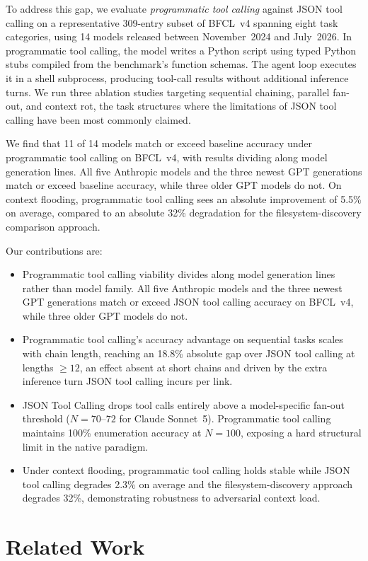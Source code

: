 \documentclass[11pt]{article}
\newcommand{\bfcl}{BFCL~v4}
\newcommand{\codemode}{programmatic tool calling}
\newcommand{\Codemode}{Programmatic tool calling}
\newcommand{\jsonmode}{JSON tool calling}
\newcommand{\Jsonmode}{JSON Tool Calling}
\newcommand{\nmodels}{14}
\begin{document}
To address this gap, we evaluate \textit{\codemode{}}
against \jsonmode{} on a representative 309-entry subset of \bfcl{}
spanning eight task categories, using \nmodels{} models released between November~2024
and July~2026.
In \codemode{}, the model writes a Python script using typed Python stubs compiled
from the benchmark's function schemas. The agent loop executes it in a shell
subprocess, producing tool-call results without additional inference turns.
We run three ablation studies targeting sequential chaining, parallel fan-out, and
context rot, the task structures where the limitations of \jsonmode{} have been
most commonly claimed.

We find that 11 of \nmodels{} models match or exceed baseline accuracy
under \codemode{} on \bfcl{}, with results dividing along model generation lines.
All five Anthropic models and the three newest GPT generations match or exceed
baseline accuracy, while three older GPT models do not.
On context flooding, \codemode{} sees an absolute improvement of 5.5\% on
average, compared to an absolute 32\% degradation for the
filesystem-discovery comparison approach.

Our contributions are:
\begin{itemize}
  \item \Codemode{} viability divides along model generation lines rather than
  model family. All five Anthropic models and the three newest GPT generations
  match or exceed \jsonmode{} accuracy on \bfcl{}, while three older GPT models
  do not.
  \item \Codemode{}'s accuracy advantage on sequential tasks scales with chain
  length, reaching an 18.8\% absolute gap over \jsonmode{} at lengths $\geq 12$,
  an effect absent at short chains and driven by the extra inference turn
  \jsonmode{} incurs per link.
  \item \Jsonmode{} drops tool calls entirely above a model-specific fan-out
  threshold ($N=70$--$72$ for Claude Sonnet~5). \Codemode{} maintains 100\%
  enumeration accuracy at $N=100$, exposing a hard structural limit in the
  native paradigm.
  \item Under context flooding, \codemode{} holds stable while \jsonmode{}
  degrades 2.3\% on average and the filesystem-discovery approach degrades
  32\%, demonstrating robustness to adversarial context load.
\end{itemize}

\section{Related Work}
\end{document}
